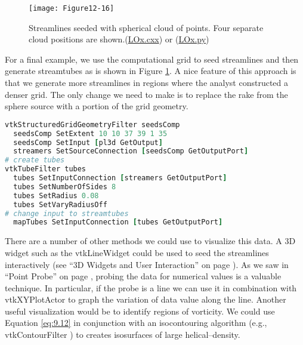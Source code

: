 \begin{figure}[!htb]
	\centering
	\texttt{[image: Figure12-16]}
	\caption{Streamlines seeded with spherical cloud of points. Four separate cloud positions are shown.(\href{https://lorensen.github.io/VTKExamples/site/Cxx/VisualizationAlgorithms/LOx/}{LOx.cxx}) or (\href{https://lorensen.github.io/VTKExamples/site/Python/VisualizationAlgorithms/LOx/}{LOx.py})}
	\label{fig:Figure12-16}
\end{figure}

For a final example, we use the computational grid to seed streamlines and then generate streamtubes as is shown in Figure \ref{fig:Figure12-16}. A nice feature of this approach is that we generate more streamlines in regions where the analyst constructed a denser grid. The only change we need to make is to replace the rake from the sphere source with a portion of the grid geometry.

\begin{lstlisting}[language=TCL, caption={Use the computational grid to seed streamlines and then generate streamtubes.}]
vtkStructuredGridGeometryFilter seedsComp
  seedsComp SetExtent 10 10 37 39 1 35
  seedsComp SetInput [pl3d GetOutput]
  streamers SetSourceConnection [seedsComp GetOutputPort]
# create tubes
vtkTubeFilter tubes
  tubes SetInputConnection [streamers GetOutputPort]
  tubes SetNumberOfSides 8
  tubes SetRadius 0.08
  tubes SetVaryRadiusOff
# change input to streamtubes
  mapTubes SetInputConnection [tubes GetOutputPort]
\end{lstlisting}

There are a number of other methods we could use to visualize this data. A 3D widget such as the vtkLineWidget could be used to seed the streamlines interactively (see ``3D Widgets and User Interaction'' on page \pageref{sec:3D_widgets_user_interaction}). As we saw in ``Point Probe'' on page \pageref{subsec:examples.point_probe}, probing the data
for numerical values is a valuable technique. In particular, if the probe is a line we can use it in combination with vtkXYPlotActor to graph the variation of data value along the line. Another useful visualization would be to identify regions of vorticity. We could use Equation \ref{eq:9.12} in conjunction with an isocontouring algorithm (e.g., vtkContourFilter ) to creates isosurfaces of large helical--density. 

